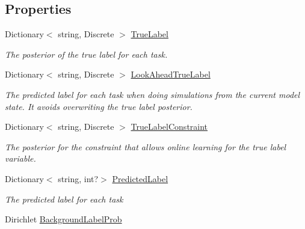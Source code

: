 \subsection*{Properties}
\begin{DoxyCompactItemize}
\item 
Dictionary$<$ string, Discrete $>$ \hyperlink{class_crowdsourcing_models_1_1_results_a140d71795dcea434130891de21d6747b}{True\+Label}
\begin{DoxyCompactList}\small\item\em The posterior of the true label for each task. \end{DoxyCompactList}\item 
Dictionary$<$ string, Discrete $>$ \hyperlink{class_crowdsourcing_models_1_1_results_afc8f124040ec1cb49c569bae611aaa93}{Look\+Ahead\+True\+Label}
\begin{DoxyCompactList}\small\item\em The predicted label for each task when doing simulations from the current model state. It avoids overwriting the true label posterior. \end{DoxyCompactList}\item 
Dictionary$<$ string, Discrete $>$ \hyperlink{class_crowdsourcing_models_1_1_results_a63c41834f4a0f9ecf4403594ae2f2cdc}{True\+Label\+Constraint}
\begin{DoxyCompactList}\small\item\em The posterior for the constraint that allows online learning for the true label variable. \end{DoxyCompactList}\item 
Dictionary$<$ string, int?$>$ \hyperlink{class_crowdsourcing_models_1_1_results_ae5a5447d6999e2afe99d68dfa839daa5}{Predicted\+Label}
\begin{DoxyCompactList}\small\item\em The predicted label for each task \end{DoxyCompactList}\item 
Dirichlet \hyperlink{class_crowdsourcing_models_1_1_results_ae14a29a61a13b39d0de986a4c7045df4}{Background\+Label\+Prob}

\end{DoxyCompactItemize}
